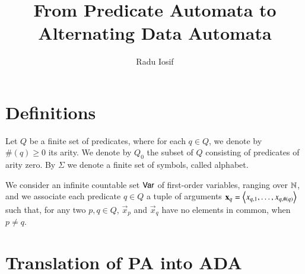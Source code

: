 \documentclass{llncs}
\begin{document}

\title{From Predicate Automata to Alternating Data Automata}

\author{Radu Iosif}

\maketitle

\section{Definitions}

Let $Q$ be a finite set of predicates, where for each $q \in Q$, we
denote by $\#(q)\geq0$ its arity. We denote by $Q_0$ the subset of $Q$
consisting of predicates of arity zero. By $\Sigma$ we denote a
finite set of symbols, called alphabet.

We consider an infinite countable set $\mathsf{Var}$ of first-order
variables, ranging over ${\bf \mathbb{N}}$, and we associate each predicate $q \in
Q$ a tuple of arguments $\mathbf x_q = \left\langle x_{q,1}, \ldots,
  x_{q,\#(q)} \right\rangle$ such that, for any two $p,q \in Q$, $\vec{x}_p$ and
$\vec{x}_q$ have no elements in common, when $p \neq q$.

\section{Translation of PA into ADA}

\end{document}
